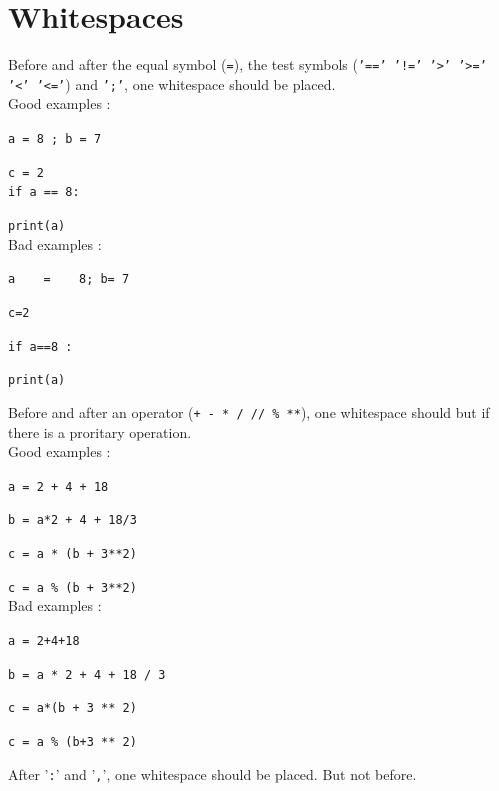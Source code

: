 \documentclass[a4paper,10pt]{report}
\begin{document}
   
  
  \section{Whitespaces}
   Before and after the equal symbol (\texttt{=}), the test symbols (\texttt{'==' '!=' '>' '>=' '<' '<='}) and \texttt{';'}, one whitespace should be placed. \\

   \noindent Good examples :
   
   \texttt{a = 8 ; b = 7}
   
   \texttt{c = 2} \\
   
   \texttt{if a == 8:}
       \par \setlength{\leftskip}{40pt} \noindent \texttt{print(a)} \\
       
   \setlength{\leftskip}{10pt} \noindent Bad examples :
   
   \texttt{a $\quad$ = $\quad$ 8; b= 7}
   
   \texttt{c=2}
   
   \texttt{if a==8 :}
   
   \setlength{\leftskip}{20pt} \texttt{print(a)} \newline
   
   \setlength{\leftskip}{10pt} \noindent Before and after an operator (\texttt{+ - * / // \% **}), one whitespace should but if there is a proritary operation. \\
   
   \noindent Good examples :
   
   \texttt{a = 2 + 4 + 18}
   
   \texttt{b = a*2 + 4 + 18/3}
   
   \texttt{c = a * (b + 3**2)}
   
   \texttt{c = a \% (b + 3**2)} \\
   
   
   \noindent Bad examples :
   
   \texttt{a = 2+4+18}
   
   \texttt{b = a * 2 + 4 + 18 / 3}
   
   \texttt{c = a*(b + 3 ** 2)}
   
   \texttt{c = a \% (b+3 ** 2)} \newline \newline
   
   
   \noindent After '\texttt{:}' and '\texttt{,}', one whitespace should be placed. But not before. \\
   
\end{document}
